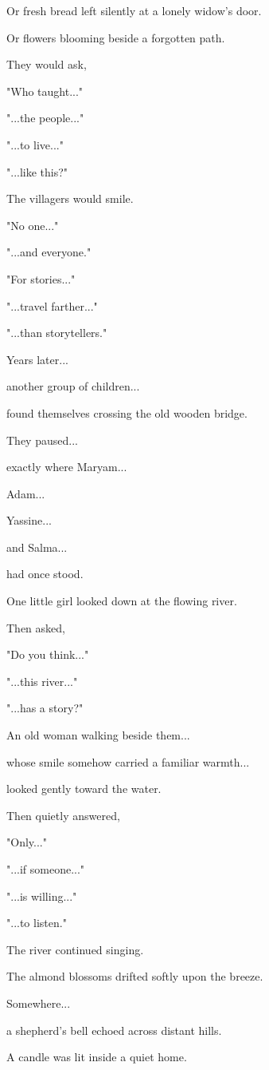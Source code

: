 \documentclass[12pt,openany]{book}
\begin{document}
Or fresh bread left silently at a lonely widow's door.

Or flowers blooming beside a forgotten path.

They would ask,

"Who taught..."

"...the people..."

"...to live..."

"...like this?"

The villagers would smile.

"No one..."

"...and everyone."

"For stories..."

"...travel farther..."

"...than storytellers."

Years later...

another group of children...

found themselves crossing the old wooden bridge.

They paused...

exactly where Maryam...

Adam...

Yassine...

and Salma...

had once stood.

One little girl looked down at the flowing river.

Then asked,

"Do you think..."

"...this river..."

"...has a story?"

An old woman walking beside them...

whose smile somehow carried a familiar warmth...

looked gently toward the water.

Then quietly answered,

"Only..."

"...if someone..."

"...is willing..."

"...to listen."

The river continued singing.

The almond blossoms drifted softly upon the breeze.

Somewhere...

a shepherd's bell echoed across distant hills.

A candle was lit inside a quiet home.
\end{document}
